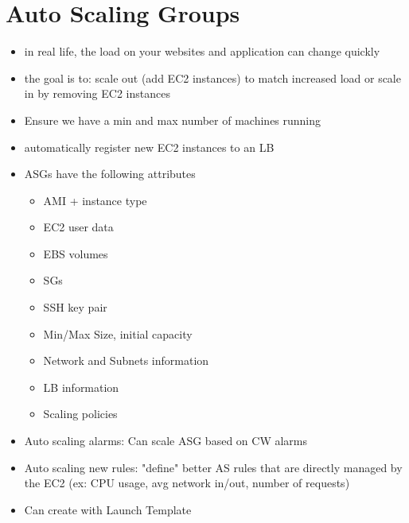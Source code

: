 \documentclass[]{scrartcl}
\begin{document}
\section{Auto Scaling Groups}
\begin{itemize}
	\item in real life, the load on your websites and application can change quickly
	\item the goal is to: scale out (add EC2 instances) to match increased load or scale in by removing EC2 instances
	\item Ensure we have a min and max number of machines running
	\item automatically register new EC2 instances to an LB
	\item ASGs have the following attributes
	\begin{itemize}
		\item AMI + instance type
		\item EC2 user data
		\item EBS volumes
		\item SGs
		\item SSH key pair
		\item Min/Max Size, initial capacity
		\item Network and Subnets information
		\item LB information
		\item Scaling policies
	\end{itemize}
	\item Auto scaling alarms: Can scale ASG based on CW alarms
	\item Auto scaling new rules: "define" better AS rules that are directly managed by the EC2 (ex: CPU usage, avg network in/out, number of requests)
	\item Can create with Launch Template
\end{itemize}
\end{document}

